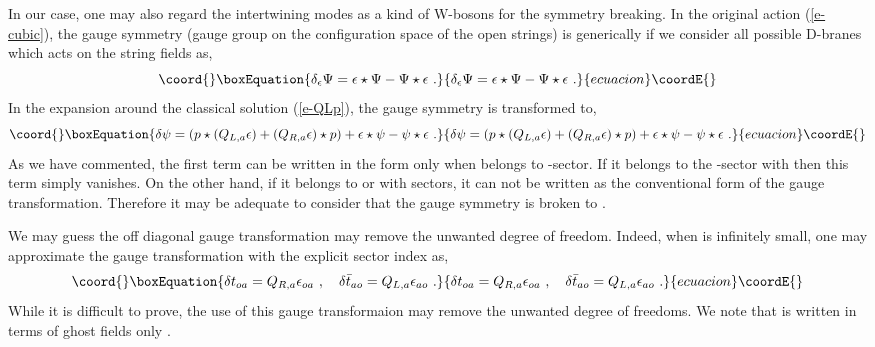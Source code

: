 \documentclass[a4paper,12pt]{article}
\begin{document}
In our case, one may also regard the intertwining modes
\coordHE{} as a kind of W-bosons for the symmetry breaking.
In the original action (\ref{e-cubic}), the gauge symmetry 
(gauge group on the configuration space of the open strings)
is generically \coordHE{} if we consider all possible
D-branes which acts on the string fields as,
\begin{equation}\coord{}\boxEquation{
 \delta_\epsilon \Psi=\epsilon\star\Psi-\Psi\star\epsilon\,\,.
}{
 \delta_\epsilon \Psi=\epsilon\star\Psi-\Psi\star\epsilon\,\,.
}{ecuacion}\coordE{}\end{equation}
In the expansion around the classical solution (\ref{e-QLp}),
the gauge symmetry is transformed to,
\begin{equation}\coord{}\boxEquation{
 \delta\psi= (p\star (Q_{L,a}\epsilon)+(Q_{R,a}\epsilon)\star p)
+\epsilon\star \psi-\psi\star\epsilon\,\,.
}{
 \delta\psi= (p\star (Q_{L,a}\epsilon)+(Q_{R,a}\epsilon)\star p)
+\epsilon\star \psi-\psi\star\epsilon\,\,.
}{ecuacion}\coordE{}\end{equation}
As we have commented, the first term can be written in
the form \coordHE{} only when \myHighlight{$\epsilon$}\coordHE{} belongs to \coordHE{}-sector.
If it belongs to the \coordHE{}-sector
with \coordHE{} then this term simply vanishes.
On the other hand, if it belongs to \coordHE{} or \coordHE{} with \coordHE{}
sectors, it can not be written as the conventional form of the
gauge transformation.  Therefore it may be adequate to consider that
the gauge symmetry \coordHE{} is broken to \coordHE{}.

We may guess the off diagonal gauge transformation may
remove the unwanted degree of freedom. Indeed, when \coordHE{}
is infinitely small, one may approximate the gauge transformation
with the explicit sector index as,
\begin{equation}\coord{}\boxEquation{
 \delta t_{oa}=Q_{R,a}\epsilon_{oa}\,\,,\quad
 \delta \bar t_{ao}= Q_{L,a}\epsilon_{ao}\,\,.
}{
 \delta t_{oa}=Q_{R,a}\epsilon_{oa}\,\,,\quad
 \delta \bar t_{ao}= Q_{L,a}\epsilon_{ao}\,\,.
}{ecuacion}\coordE{}\end{equation}
While it is difficult to prove,
the use of this gauge transformaion may remove
the unwanted degree of freedoms.
We note that \coordHE{} is written  in terms of ghost 
fields only \cite{r-Romans}.
\end{document}
